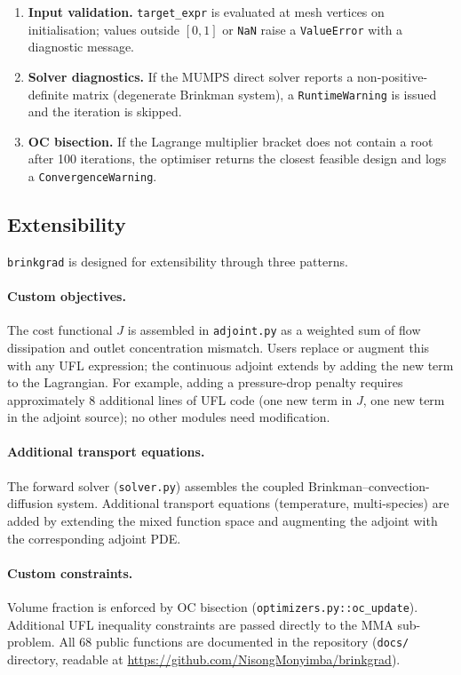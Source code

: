 \begin{enumerate}\itemsep2pt
    \item \textbf{Input validation.}
          \texttt{target\_expr} is evaluated at mesh vertices
          on initialisation; values outside $[0,1]$ or \texttt{NaN}
          raise a \texttt{ValueError} with a diagnostic message.
    \item \textbf{Solver diagnostics.}
          If the MUMPS direct solver reports a non-positive-definite
          matrix (degenerate Brinkman system), a \texttt{RuntimeWarning}
          is issued and the iteration is skipped.
    \item \textbf{OC bisection.}
          If the Lagrange multiplier bracket does not contain a root
          after 100 iterations, the optimiser returns the closest
          feasible design and logs a \texttt{ConvergenceWarning}.
\end{enumerate}

\subsection{Extensibility}
\label{sec:extensibility}

\texttt{brinkgrad} is designed for extensibility through three patterns.

\paragraph{Custom objectives.}
The cost functional $J$ is assembled in \texttt{adjoint.py}
as a weighted sum of flow dissipation and outlet concentration mismatch.
Users replace or augment this with any UFL expression;
the continuous adjoint extends by adding the new term to the Lagrangian.
For example, adding a pressure-drop penalty requires
approximately 8 additional lines of UFL code
(one new term in $J$, one new term in the adjoint source);
no other modules need modification.

\paragraph{Additional transport equations.}
The forward solver (\texttt{solver.py}) assembles the coupled
Brinkman--convection-diffusion system.
Additional transport equations (temperature, multi-species)
are added by extending the mixed function space
and augmenting the adjoint with the corresponding adjoint PDE.

\paragraph{Custom constraints.}
Volume fraction is enforced by OC bisection
(\texttt{optimizers.py::oc\_update}).
Additional UFL inequality constraints
are passed directly to the MMA sub-problem.
All 68 public functions are documented in the repository
(\texttt{docs/} directory, readable at
\url{https://github.com/NisongMonyimba/brinkgrad}).


